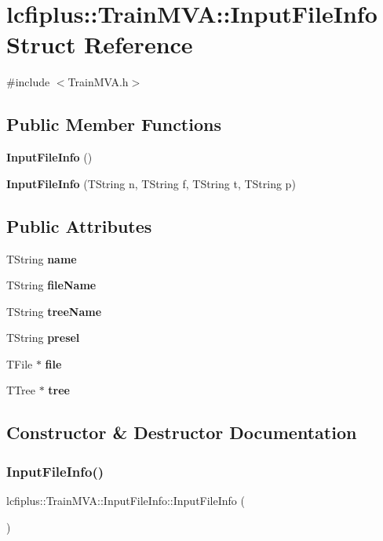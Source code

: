 \section{lcfiplus\+:\+:Train\+M\+VA\+:\+:Input\+File\+Info Struct Reference}
\label{structlcfiplus_1_1TrainMVA_1_1InputFileInfo}


{\ttfamily \#include $<$Train\+M\+V\+A.\+h$>$}

\subsection*{Public Member Functions}
\begin{DoxyCompactItemize}
\item 
\textbf{ Input\+File\+Info} ()
\item 
\textbf{ Input\+File\+Info} (T\+String n, T\+String f, T\+String t, T\+String p)
\end{DoxyCompactItemize}
\subsection*{Public Attributes}
\begin{DoxyCompactItemize}
\item 
T\+String \textbf{ name}
\item 
T\+String \textbf{ file\+Name}
\item 
T\+String \textbf{ tree\+Name}
\item 
T\+String \textbf{ presel}
\item 
T\+File $\ast$ \textbf{ file}
\item 
T\+Tree $\ast$ \textbf{ tree}
\end{DoxyCompactItemize}


\subsection{Constructor \& Destructor Documentation}
\mbox{\label{structlcfiplus_1_1TrainMVA_1_1InputFileInfo_a2da0c487bc09914ac7a3850652fc8894}} 
\subsubsection{Input\+File\+Info()\hspace{0.1cm}{\footnotesize\ttfamily [1/2]}}
{\footnotesize\ttfamily lcfiplus\+::\+Train\+M\+V\+A\+::\+Input\+File\+Info\+::\+Input\+File\+Info (\begin{DoxyParamCaption}{ }\end{DoxyParamCaption})\hspace{0.3cm}{\ttfamily [inline]}}

